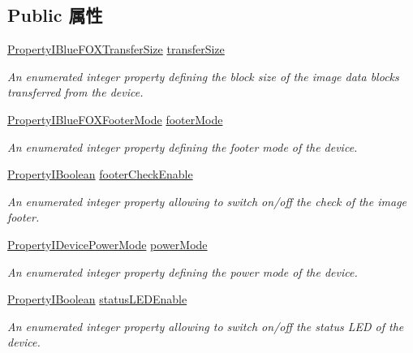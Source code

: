 \subsection*{Public 属性}
\begin{DoxyCompactItemize}
\item 
\hyperlink{group___device_specific_interface_gaae90f3807daf211cdd7b687603d2f787}{Property\+I\+Blue\+F\+O\+X\+Transfer\+Size} \hyperlink{classmv_i_m_p_a_c_t_1_1acquire_1_1_system_blue_f_o_x_acf916c9ee98d686ac1e9a00afc4a459c}{transfer\+Size}
\begin{DoxyCompactList}\small\item\em An enumerated integer property defining the block size of the image data blocks transferred from the device. \end{DoxyCompactList}\item 
\hyperlink{group___device_specific_interface_ga8c511231b6952821a370f845fea50d00}{Property\+I\+Blue\+F\+O\+X\+Footer\+Mode} \hyperlink{classmv_i_m_p_a_c_t_1_1acquire_1_1_system_blue_f_o_x_a871d6c6d03071605f028f0aa7b756099}{footer\+Mode}
\begin{DoxyCompactList}\small\item\em An enumerated integer property defining the footer mode of the device. \end{DoxyCompactList}\item 
\hyperlink{group___common_interface_ga44f9437e24b21b6c93da9039ec6786aa}{Property\+I\+Boolean} \hyperlink{classmv_i_m_p_a_c_t_1_1acquire_1_1_system_blue_f_o_x_ae43ca8f81b19321fa9318256ef0d1f2e}{footer\+Check\+Enable}
\begin{DoxyCompactList}\small\item\em An enumerated integer property allowing to switch on/off the check of the image footer. \end{DoxyCompactList}\item 
\hyperlink{group___device_specific_interface_ga82621bec575e1885ef8589f5ebfdc43d}{Property\+I\+Device\+Power\+Mode} \hyperlink{classmv_i_m_p_a_c_t_1_1acquire_1_1_system_blue_f_o_x_a8bc3dfd608fc4c31fb6b4d7335ee0ad7}{power\+Mode}
\begin{DoxyCompactList}\small\item\em An enumerated integer property defining the power mode of the device. \end{DoxyCompactList}\item 
\hyperlink{group___common_interface_ga44f9437e24b21b6c93da9039ec6786aa}{Property\+I\+Boolean} \hyperlink{classmv_i_m_p_a_c_t_1_1acquire_1_1_system_blue_f_o_x_a2325109394ecc9b7c202b5512b5ecea8}{status\+L\+E\+D\+Enable}
\begin{DoxyCompactList}\small\item\em An enumerated integer property allowing to switch on/off the status L\+E\+D of the device. \end{DoxyCompactList}\end{DoxyCompactItemize}
